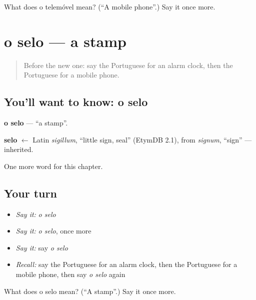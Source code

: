 \begin{tcolorbox}[breakable,colback=teal!4,colframe=teal!35!black,title={Before you move on}]
What does o telemóvel mean? (\textquotedblleft{}A mobile phone\textquotedblright{}.) Say it once more.
\end{tcolorbox}
\section[o selo]{o selo — a stamp}

\label{lesson:PT-C100-selo}



\begin{quote}
Before the new one: say the Portuguese for an alarm clock, then the Portuguese for a mobile phone.
\end{quote}

\subsection*{You'll want to know: o selo}
\textbf{o selo} — \textquotedblleft{}a stamp\textquotedblright{}.

\begin{cousinweb}
\textbf{selo} $\leftarrow$ Latin \emph{sigillum}, \textquotedblleft{}little sign, seal\textquotedblright{} (EtymDB 2.1), from \emph{signum}, \textquotedblleft{}sign\textquotedblright{} — inherited.
\end{cousinweb}

\begin{grammarlens}[title={What you've built}]
One more word for this chapter.
\end{grammarlens}

\subsection*{Your turn}
\begin{itemize}
\raggedright
  \item \emph{Say it:} \emph{o selo}
  \item \emph{Say it:} \emph{o selo}, once more
  \item \emph{Say it:} say \emph{o selo}
  \item \emph{Recall:} say the Portuguese for an alarm clock, then the Portuguese for a mobile phone, then say \emph{o selo} again
\end{itemize}

\begin{tcolorbox}[breakable,colback=teal!4,colframe=teal!35!black,title={Before you move on}]
What does o selo mean? (\textquotedblleft{}A stamp\textquotedblright{}.) Say it once more.
\end{tcolorbox}
